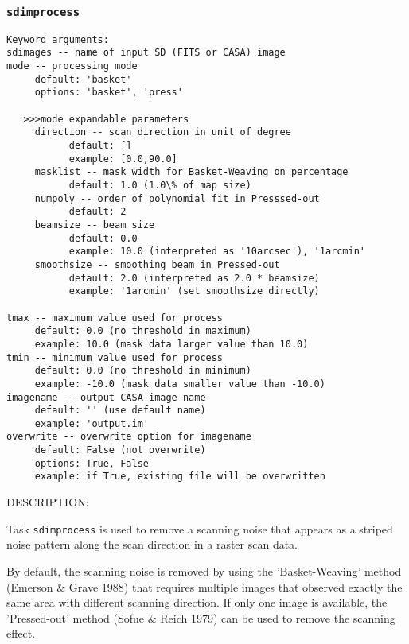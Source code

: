 

\subsubsection{{\tt sdimprocess}}
\label{section:sd.sdtasks.tasks.sdimprocess}

\begin{verbatim}
Keyword arguments:
sdimages -- name of input SD (FITS or CASA) image
mode -- processing mode
     default: 'basket'
     options: 'basket', 'press'
     
   >>>mode expandable parameters
     direction -- scan direction in unit of degree
           default: []
           example: [0.0,90.0]
     masklist -- mask width for Basket-Weaving on percentage
           default: 1.0 (1.0\% of map size)
     numpoly -- order of polynomial fit in Presssed-out
           default: 2
     beamsize -- beam size 
           default: 0.0
           example: 10.0 (interpreted as '10arcsec'), '1arcmin'
     smoothsize -- smoothing beam in Pressed-out
           default: 2.0 (interpreted as 2.0 * beamsize)
           example: '1arcmin' (set smoothsize directly)
           
tmax -- maximum value used for process
     default: 0.0 (no threshold in maximum)
     example: 10.0 (mask data larger value than 10.0)
tmin -- minimum value used for process
     default: 0.0 (no threshold in minimum)
     example: -10.0 (mask data smaller value than -10.0)
imagename -- output CASA image name
     default: '' (use default name)
     example: 'output.im'
overwrite -- overwrite option for imagename
     default: False (not overwrite)
     options: True, False
     example: if True, existing file will be overwritten
\end{verbatim}

        DESCRIPTION:

        Task {\tt sdimprocess} is used to remove a scanning noise that appears 
        as a striped noise pattern along the scan direction in a raster 
        scan data. 

        By default, the scanning noise is removed by using the 
        'Basket-Weaving' method (Emerson \& Grave 1988) that requires 
        multiple images that observed exactly the same area with different 
        scanning direction. If only one image is available, the 'Pressed-out' 
method (Sofue \& Reich 1979) can be used to remove the scanning 
        effect.

